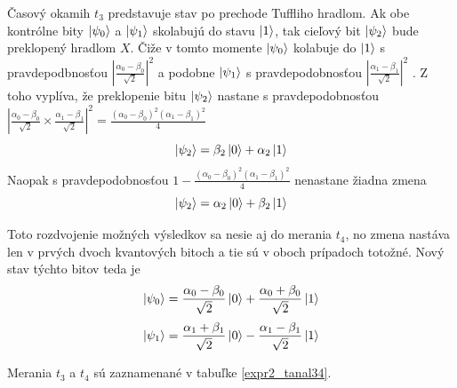 Časový okamih \(t_3\) predstavuje stav po prechode Tuffliho hradlom. Ak obe 
kontrólne bity \(\ket{\psi_0}\) a \(\ket{\psi_1}\) skolabujú do stavu 
\(\ket{1}\), tak cieľový bit \(\ket{\psi_2}\) bude preklopený hradlom \(X\).
Čiže v tomto momente \(\ket{\psi_0}\) kolabuje do \(\ket{1}\) s 
pravdepodbnosťou \(|\frac{\alpha_0 - \beta_0}{\sqrt{2}}|^2\) a podobne 
\(\ket{\psi_1}\) s pravdepodobnosťou \(|\frac{\alpha_1 - \beta_1}{\sqrt{2}}|^2\)
. Z toho vyplíva, že preklopenie bitu \(\ket{\psi_2}\) nastane
s pravdepodobnosťou  \(|\frac{\alpha_0 - \beta_0}{\sqrt{2}} \times \frac{\alpha_1 - \beta_1}{\sqrt{2}}|^2 = \frac{(\alpha_0 - \beta_0)^2(\alpha_1 - \beta_1)^2}{4}\)
\[\ket{\psi_2} = \beta_2\ket{0} + \alpha_2\ket{1}\]
Naopak s pravdepodobnosťou \(1 - \frac{(\alpha_0 - \beta_0)^2(\alpha_1 - \beta_1)^2}{4}\)
nenastane žiadna zmena
\[\ket{\psi_2} = \alpha_2\ket{0} + \beta_2\ket{1}\]

Toto rozdvojenie možných výsledkov sa nesie aj do merania \(t_4\), no zmena
nastáva len v prvých dvoch kvantových bitoch a tie sú v oboch prípadoch 
totožné. Nový stav týchto bitov teda je 
\[\ket{\psi_0} = \frac{\alpha_0 - \beta_0}{\sqrt{2}}\ket{0} + \frac{\alpha_0 + \beta_0}{\sqrt{2}}\ket{1}\]
\[\ket{\psi_1} = \frac{\alpha_1 + \beta_1}{\sqrt{2}}\ket{0} - \frac{\alpha_1 - \beta_1}{\sqrt{2}}\ket{1}\]

Merania \(t_3\) a \(t_4\) sú zaznamenané v tabuľke \ref{expr2_tanal34}.

